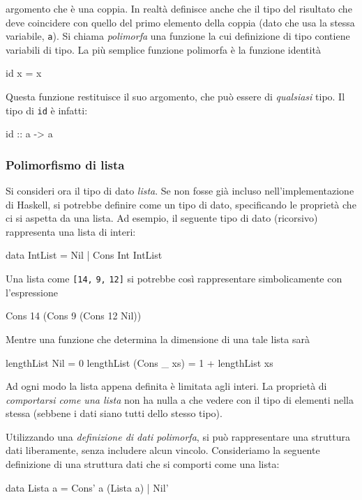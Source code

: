 argomento che \`e una coppia. In realt\`a definisce anche che il tipo del 
risultato che deve coincidere con quello del primo elemento della coppia (dato che 
usa la stessa variabile, \verb"a"). Si chiama \emph{polimorfa} una 
funzione la cui definizione di tipo contiene variabili di tipo. La pi\`u 
semplice funzione polimorfa \`e la funzione identit\`a
\begin{haskellCode}
id x = x
\end{haskellCode}
Questa funzione restituisce il suo argomento, che pu\`o essere di \emph{qualsiasi} tipo. 
Il tipo di \verb"id" \`e infatti:
\begin{haskellCode}
id :: a -> a
\end{haskellCode}

\subsubsection{Polimorfismo di lista}
Si consideri ora il tipo di dato \emph{lista}. Se non fosse gi\`a incluso 
nell'implementazione di Haskell, si potrebbe definire come un tipo di 
dato, specificando le propriet\`a che ci si aspetta da una lista. Ad 
esempio, il seguente tipo di dato (ricorsivo) rappresenta una lista di 
interi:
\begin{haskellCode}
data IntList = Nil
    | Cons Int IntList
\end{haskellCode}
Una lista come \verb"[14," \verb"9," \verb"12]" si potrebbe cos\`i rappresentare simbolicamente con l'espressione
\begin{haskellCode}
Cons 14 (Cons 9 (Cons 12 Nil))
\end{haskellCode}
Mentre una funzione che determina la dimensione di una tale lista sar\`a
\begin{haskellCode}
lengthList Nil = 0
lengthList (Cons _ xs) = 1 + lengthList xs
\end{haskellCode}
Ad ogni modo la lista appena definita \`e limitata agli interi. La 
propriet\`a di \emph{comportarsi come una lista} non ha nulla a che vedere 
con il tipo di elementi nella stessa (sebbene i dati siano tutti dello 
stesso tipo).

Utilizzando una \emph{definizione di dati polimorfa}, si pu\`o 
rappresentare una struttura dati liberamente, senza includere alcun vincolo. 
Consideriamo la seguente definizione di una struttura dati che si 
comporti come una lista:
\begin{haskellCode}
data Lista a = Cons' a (Lista a)
    | Nil'
\end{haskellCode}


